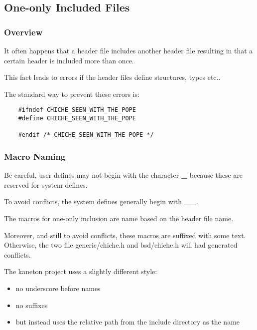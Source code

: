 \documentclass[9pt]{beamer}
\newcommand{\nl}[0]{\vspace{0.4cm}}
\begin{document}
%
%

\subsection{One-only Included Files}


\begin{frame}[containsverbatim]
  \frametitle{Overview}

  It often happens that a header file includes another header file resulting in
  that a certain header is included more than once.

  \nl

  This fact leads to errors if the header files define structures, types etc..

  \nl

  The standard way to prevent these errors is:

  \begin{verbatim}
    #ifndef CHICHE_SEEN_WITH_THE_POPE
    #define CHICHE_SEEN_WITH_THE_POPE

    #endif /* CHICHE_SEEN_WITH_THE_POPE */
  \end{verbatim}
\end{frame}


\begin{frame}
  \frametitle{Macro Naming}

  Be careful, user defines may not begin with the character \textbf{\_}
  because these are reserved for system defines.

  \nl

  To avoid conflicts, the system defines generally begin with \textbf{\_\_}.

  \nl

  The macros for one-only inclusion are name based on the header file name.

  \nl

  Moreover, and still to avoid conflicts, these macros are suffixed with
  some text. Otherwise, the two file generic/chiche.h and bsd/chiche.h
  will had generated conflicts.

  \nl

  The kaneton project uses a slightly different style:

  \begin{itemize}
    \item
      no underscore before names
    \item
      no suffixes
    \item
      but instead uses the relative path from the include directory
      as the name
  \end{itemize}

\end{frame}
\end{document}
